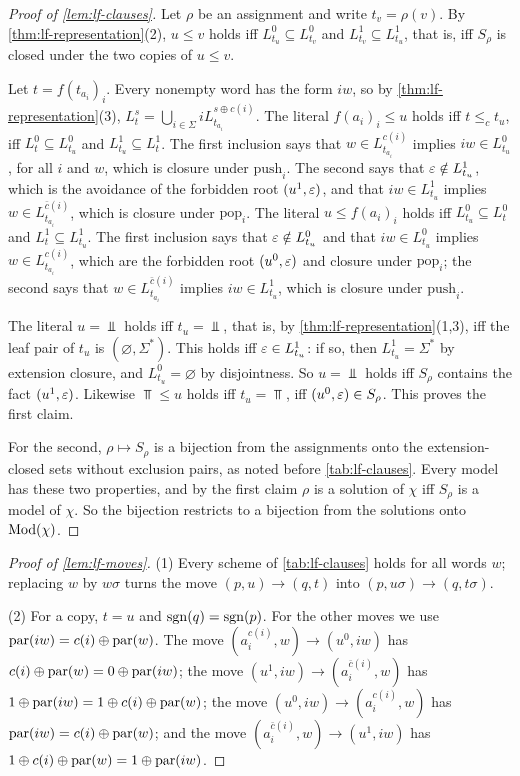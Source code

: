 \begin{proof}[Proof of \cref{lem:lf-clauses}]
Let $\rho$ be an assignment and write $t_v=\rho(v)$. By
\cref{thm:lf-representation}(2), $u\le v$ holds iff
$L^0_{t_u}\subseteq L^0_{t_v}$ and $L^1_{t_v}\subseteq L^1_{t_u}$, that is,
iff $S_\rho$ is closed under the two copies of $u\le v$.

Let $t=f(t_{a_i})_i$. Every nonempty word has the form $iw$, so by
\cref{thm:lf-representation}(3),
$L^s_t=\bigcup_{i\in\Sigma}iL^{s\oplus c(i)}_{t_{a_i}}$. The literal
$f(a_i)_i\le u$ holds iff $t\le_c t_u$, iff $L^0_t\subseteq L^0_{t_u}$ and
$L^1_{t_u}\subseteq L^1_t$. The first inclusion says that
$w\in L^{c(i)}_{t_{a_i}}$ implies $iw\in L^0_{t_u}$, for all $i$ and $w$,
which is closure under $\mathrm{push}_i$. The second says that
$\varepsilon\notin L^1_{t_u}$, which is the avoidance of the forbidden root
$(u^1,\varepsilon)$, and that $iw\in L^1_{t_u}$ implies
$w\in L^{\bar c(i)}_{t_{a_i}}$, which is closure under $\mathrm{pop}_i$. The
literal $u\le f(a_i)_i$ holds iff $L^0_{t_u}\subseteq L^0_t$ and
$L^1_t\subseteq L^1_{t_u}$. The first inclusion says that
$\varepsilon\notin L^0_{t_u}$ and that $iw\in L^0_{t_u}$ implies
$w\in L^{c(i)}_{t_{a_i}}$, which are the forbidden root $(u^0,\varepsilon)$ and
closure under $\mathrm{pop}_i$; the second says that
$w\in L^{\bar c(i)}_{t_{a_i}}$ implies $iw\in L^1_{t_u}$, which is closure
under $\mathrm{push}_i$.

The literal $u=\Bot$ holds iff $t_u=\Bot$, that is, by
\cref{thm:lf-representation}(1,3), iff the leaf pair of $t_u$ is
$(\varnothing,\Sigma^*)$. This holds iff $\varepsilon\in L^1_{t_u}$: if so, then
$L^1_{t_u}=\Sigma^*$ by extension closure, and $L^0_{t_u}=\varnothing$ by
disjointness. So $u=\Bot$ holds iff $S_\rho$ contains the fact
$(u^1,\varepsilon)$. Likewise $\Top\le u$ holds iff $t_u=\Top$, iff
$(u^0,\varepsilon)\in S_\rho$. This proves the first claim.

For the second, $\rho\mapsto S_\rho$ is a bijection from the assignments onto
the extension-closed sets without exclusion pairs, as noted before
\cref{tab:lf-clauses}. Every model has these two properties, and by the
first claim $\rho$ is a solution of $\chi$ iff $S_\rho$ is a model of $\chi$.
So the bijection restricts to a bijection from the solutions onto
$\operatorname{Mod}(\chi)$.
\end{proof}

\begin{proof}[Proof of \cref{lem:lf-moves}]
(1) Every scheme of \cref{tab:lf-clauses} holds for all words $w$; replacing
$w$ by $w\sigma$ turns the move $(p,u)\to(q,t)$ into
$(p,u\sigma)\to(q,t\sigma)$.

(2) For a copy, $t=u$ and $\operatorname{sgn}(q)=\operatorname{sgn}(p)$. For the other moves we use
$\operatorname{par}(iw)=c(i)\oplus\operatorname{par}(w)$. The move $(a_i^{c(i)},w)\to(u^0,iw)$ has
$c(i)\oplus\operatorname{par}(w)=0\oplus\operatorname{par}(iw)$; the move
$(u^1,iw)\to(a_i^{\bar c(i)},w)$ has
$1\oplus\operatorname{par}(iw)=1\oplus c(i)\oplus\operatorname{par}(w)$; the move
$(u^0,iw)\to(a_i^{c(i)},w)$ has $\operatorname{par}(iw)=c(i)\oplus\operatorname{par}(w)$; and the
move $(a_i^{\bar c(i)},w)\to(u^1,iw)$ has
$1\oplus c(i)\oplus\operatorname{par}(w)=1\oplus\operatorname{par}(iw)$.
\end{proof}

